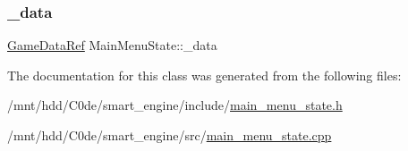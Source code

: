 \subsubsection{\texorpdfstring{\+\_\+data}{\_data}}
{\footnotesize\ttfamily \hyperlink{game_8h_a513c9dd465a0df41dbb4daf40cc717c2}{Game\+Data\+Ref} Main\+Menu\+State\+::\+\_\+data\hspace{0.3cm}{\ttfamily [private]}}



The documentation for this class was generated from the following files\+:\begin{DoxyCompactItemize}
\item 
/mnt/hdd/\+C0de/smart\+\_\+engine/include/\hyperlink{main__menu__state_8h}{main\+\_\+menu\+\_\+state.\+h}\item 
/mnt/hdd/\+C0de/smart\+\_\+engine/src/\hyperlink{main__menu__state_8cpp}{main\+\_\+menu\+\_\+state.\+cpp}\end{DoxyCompactItemize}
